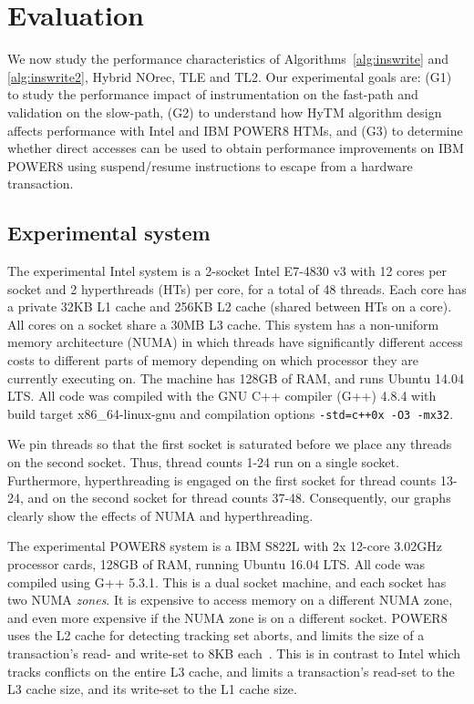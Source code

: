 \section{Evaluation}
\label{sec:eval}
%
We now study the performance characteristics of Algorithms~\ref{alg:inswrite} and \ref{alg:inswrite2}, Hybrid NOrec, TLE and TL2.
Our experimental goals are: (G1) to study the performance impact of instrumentation on the fast-path and validation on the slow-path, 
(G2) to understand how HyTM algorithm design affects performance with Intel and IBM POWER8 HTMs, and 
(G3) to determine whether direct accesses can be used to obtain performance improvements on IBM POWER8 using suspend/resume instructions to escape from a hardware transaction.

\subsection{Experimental system}
The experimental Intel system is a 2-socket Intel E7-4830 v3 with 12 cores per socket and 2 hyperthreads (HTs) per core, for a total of 48 threads.
Each core has a private 32KB L1 cache and 256KB L2 cache (shared between HTs on a core).
All cores on a socket share a 30MB L3 cache.
This system has a non-uniform memory architecture (NUMA) in which threads have significantly different access costs to different parts of memory depending on which processor they are currently executing on.
The machine has 128GB of RAM, and runs Ubuntu 14.04 LTS.
All code was compiled with the GNU C++ compiler (G++) 4.8.4 with build target x86\_64-linux-gnu and compilation options \texttt{-std=c++0x -O3 -mx32}.

We pin threads so that the first socket is saturated before we place any threads on the second socket.
Thus, thread counts 1-24 run on a single socket.
Furthermore, hyperthreading is engaged on the first socket for thread counts 13-24, and on the second socket for thread counts 37-48.
Consequently, our graphs clearly show the effects of NUMA and hyperthreading.

The experimental POWER8 system is a IBM S822L with 2x 12-core 3.02GHz processor cards, 128GB of RAM, running Ubuntu 16.04 LTS.
All code was compiled using G++ 5.3.1.
This is a dual socket machine, and each socket has two NUMA \emph{zones}.
It is expensive to access memory on a different NUMA zone, and even more expensive if the NUMA zone is on a different socket.
POWER8 uses the L2 cache for detecting tracking set aborts, and limits the size of a transaction's read- and write-set to 8KB each~\cite{htm-survey}.
This is in contrast to Intel which tracks conflicts on the entire L3 cache, and limits a transaction's read-set to the L3 cache size, and its write-set to the L1 cache size.

